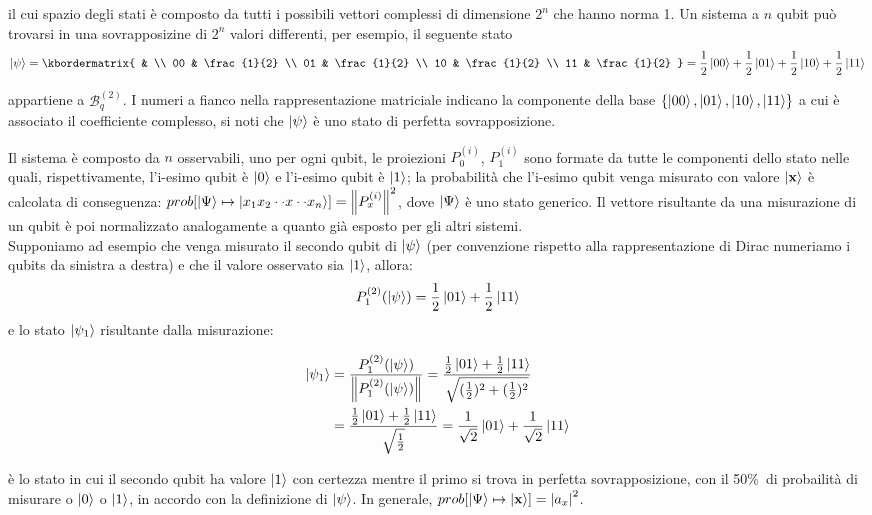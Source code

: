 \documentclass[12pt,a4paper,openright]{report}
\newcommand{\norm}[1]{\left\lVert#1\right\rVert}
\begin{document}
il cui spazio degli stati è composto da tutti i possibili vettori complessi di dimensione $2^n$ che hanno norma 1. Un sistema a $n$ qubit può trovarsi in una sovrapposizine di $2^n$ valori differenti, per esempio, il seguente stato  
\[
    \ket{\psi} = 
         \kbordermatrix{
              &    \\
          00 & \frac{1}{2} \\
          01 & \frac{1}{2} \\
          10 & \frac{1}{2} \\
          11 & \frac{1}{2}   
            } = \frac{1}{2}\ket{00} + \frac{1}{2}\ket{01} + \frac{1}{2}\ket{10} + \frac{1}{2}\ket{11}
\] 

appartiene a $\mathcal{B}_q^{(2)}$. I numeri a fianco nella rappresentazione matriciale indicano la componente della base $\{ \ket{00}, \ket{01}, \ket{10}, \ket{11} \}$ a cui è associato il coefficiente complesso,
si noti che $\ket{\psi}$ è uno stato di perfetta sovrapposizione.\par
Il sistema è composto da $n$ osservabili, uno per ogni qubit, le proiezioni ${P^{(i)}_0}$, ${P^{(i)}_1}$ sono formate da tutte le componenti dello stato nelle quali, rispettivamente, l'i-esimo qubit è $\ket0$
e l'i-esimo qubit è $\ket1$; la probabilità che l'i-esimo qubit venga misurato con valore $\ket{\textbf{x}}$ è calcolata di conseguenza:
$prob[\ket{\Psi} \mapsto \ket{x_1 x_2 \cdot \cdot x \cdot \cdot x_n}]= \norm{{P^{(i)}_x}}^2$, dove $\ket{\Psi}$ è uno stato generico. Il vettore risultante da una misurazione di un qubit è poi normalizzato analogamente a quanto già esposto per gli altri sistemi.\\
Supponiamo ad esempio che venga misurato il secondo qubit di $\ket{\psi}$ (per convenzione rispetto alla rappresentazione di Dirac numeriamo i qubits da sinistra a destra) e che il valore osservato sia $\ket1$, allora:
\[
    {P^{(2)}_1}(\ket{\psi}) = \frac{1}{2}\ket{01} + \frac{1}{2}\ket{11}  
\]
e lo stato $\ket{\psi_1}$ risultante dalla misurazione:
\begin{center}
    \begin{align*}
        \ket{\psi_1} &= \frac{{P^{(2)}_1}(\ket{\psi}) }{ \norm{{P^{(2)}_1}(\ket{\psi})} } = \frac{\frac{1}{2}\ket{01} + \frac{1}{2}\ket{11}}{\sqrt{(\frac{1}{2})^2 + (\frac{1}{2})^2}}\\
        &= \frac{\frac{1}{2}\ket{01} + \frac{1}{2}\ket{11}}{\sqrt{\frac{1}{2}}} = \frac{1}{\sqrt2}\ket{01} + \frac{1}{\sqrt2}\ket{11}
    \end{align*}
\end{center}
è lo stato in cui il secondo qubit ha valore $\ket1$ con certezza mentre il primo si trova in perfetta sovrapposizione, con il 50\%\ di probailità di misurare o $\ket0$ o $\ket1$, in accordo con la definizione
di $\ket{\psi}$. In generale, $prob[\ket{\Psi} \mapsto \ket{\textbf{x}}] ={\left\vert{a_x}\right\vert}^2$.\par
\end{document}

